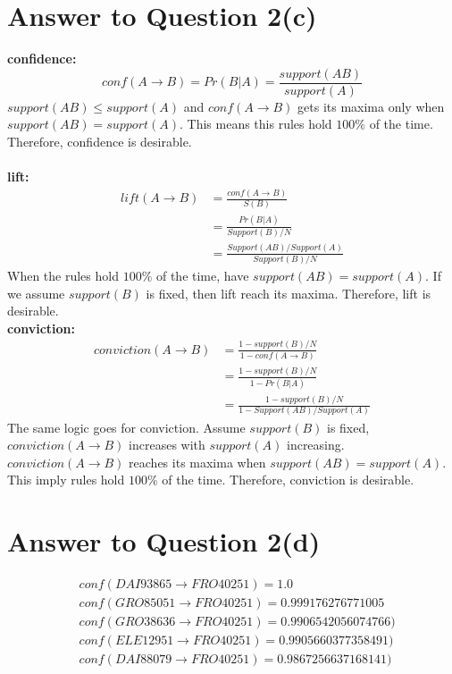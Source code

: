 \documentclass[11pt]{article}
\begin{document}
\pagebreak[4]
\section*{Answer to Question 2(c)}
\textbf{confidence: }\\
\begin{equation}
    conf(A\rightarrow B) = Pr(B|A) = \frac{support(AB)}{support(A)}
\end{equation}
$support(AB) \leq support(A)$ and $conf(A\rightarrow B)$ gets its maxima only when $support(AB) = support(A)$.
This means this rules hold $100\%$ of the time. Therefore, confidence is desirable.\\
\\
\textbf{lift: }
\begin{equation}
\begin{aligned}
    lift(A\rightarrow B) & = \frac{conf(A\rightarrow B)}{S(B)}\\
    & = \frac{Pr(B|A)}{Support(B)/N}\\
    & = \frac{Support(AB)/Support(A)}{Support(B)/N}
\end{aligned}
\end{equation}
When the rules hold $100\%$ of the time, have $support(AB) = support(A)$.
If we assume $support(B)$ is fixed, then lift reach its maxima. Therefore, lift is desirable.
\\
\textbf{conviction: }
\begin{equation}
\begin{aligned}
    conviction(A\rightarrow B) & = \frac{1 - support(B)/N}{1 - conf(A\rightarrow B)}\\
    & = \frac{1 - support(B)/N}{1 - Pr(B|A)}\\
    & = \frac{1 - support(B)/N}{1 - Support(AB)/Support(A)}
\end{aligned}
\end{equation}
The same logic goes for conviction.
Assume $support(B)$ is fixed, $conviction(A\rightarrow B)$ increases with $support(A)$ increasing.
$conviction(A\rightarrow B)$ reaches its maxima when $support(AB) = support(A)$. This imply rules hold $100\%$ of the time.
Therefore, conviction is desirable.

\pagebreak[4]
\section*{Answer to Question 2(d)}
\begin{equation*}
\begin{aligned}
& conf(DAI93865\rightarrow FRO40251) = 1.0\\
& conf(GRO85051\rightarrow FRO40251) = 0.999176276771005\\
& conf(GRO38636\rightarrow FRO40251) = 0.9906542056074766)\\
& conf(ELE12951\rightarrow FRO40251) = 0.9905660377358491)\\
& conf(DAI88079\rightarrow FRO40251) = 0.9867256637168141)
\end{aligned}
\end{equation*}
\end{document}
